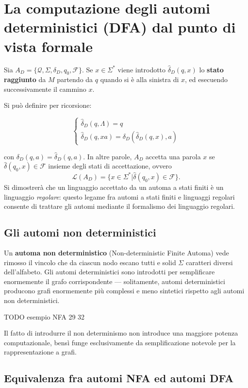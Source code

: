 \documentclass[10pt]{\classname}
\begin{document}
\section{La computazione degli automi deterministici (DFA) dal punto di vista formale}

Sia $A_D = \{ \mathcal Q, \Sigma, \delta_D, q_0, \mathcal F\}$. Se $x\in
\Sigma^*$ viene introdotto $\hat\delta_D (q, x)$ lo \textbf{stato raggiunto} da
$M$ partendo da $q$ quando si è alla sinistra di $x$, ed esecuendo
successivamente il cammino $x$.

Si può definire per ricorsione:

$$
\left\{
    \begin{array}{l}
        \hat\delta_D (q, \Lambda) = q \\
        \hat\delta_D (q, xa) = \delta _D (\hat\delta_D (q, x), a)
    \end{array}
\right.
$$

con $\delta_D(q, a) = \hat\delta_D(q, a)$. In altre parole, $A_D$ accetta una
parola $x$ se $\hat\delta(q_0, x) \in \mathcal F$ insieme degli stati di
accettazione, ovvero $$\mathcal L(A_D) = \{x\in \Sigma^* | \hat\delta(q_0, x)
\in \mathcal F\}.$$ Si dimostrerà che un linguaggio accettato da un automa a
stati finiti è un linguaggio \emph{regolare}: questo legame fra automi a stati
finiti e linguaggi regolari consente di trattare gli automi mediante il
formalismo dei linguaggio regolari.

\subsection{Gli automi non deterministici}

Un \textbf{automa non deterministico} (Non-deterministic Finite Automa) vede
rimosso il vincolo che da ciascun nodo escano tutti e solid $\Sigma$ caratteri
diversi dell'alfabeto. Gli automi deterministici sono introdotti per
semplificare enormemente il grafo corrispondente --- solitamente, automi
deterministici producono grafi enormemente più complessi e meno sintetici
rispetto agli automi non deterministici.


TODO esempio NFA 29 32 

Il fatto di introdurre il non determinismo non introduce una maggiore potenza
computazionale, bensì funge esclusivamente da semplificazione notevole per la
rappresentazione a grafi.

\subsection{Equivalenza fra automi NFA ed automi DFA}
\end{document}
